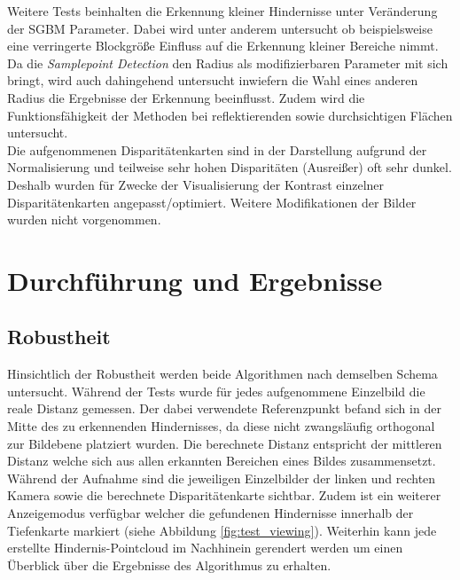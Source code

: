 \noindent
Weitere Tests beinhalten die Erkennung kleiner Hindernisse unter Veränderung der SGBM Parameter. Dabei wird unter anderem untersucht ob beispielsweise eine verringerte Blockgröße Einfluss auf die Erkennung kleiner Bereiche nimmt. Da die \emph{Samplepoint Detection} den Radius als modifizierbaren Parameter mit sich bringt, wird auch dahingehend untersucht inwiefern die Wahl eines anderen Radius die Ergebnisse der Erkennung beeinflusst. Zudem wird die Funktionsfähigkeit der Methoden bei reflektierenden sowie durchsichtigen Flächen untersucht.\\

\noindent
Die aufgenommenen Disparitätenkarten sind in der Darstellung aufgrund der Normalisierung und teilweise sehr hohen Disparitäten (Ausreißer) oft sehr dunkel. Deshalb wurden für Zwecke der Visualisierung der Kontrast einzelner Disparitätenkarten angepasst/optimiert. Weitere Modifikationen der Bilder wurden nicht vorgenommen.


\section{Durchführung und Ergebnisse}

\subsection{Robustheit}
\label{sec:robustness_evaluation}

Hinsichtlich der Robustheit werden beide Algorithmen nach demselben Schema untersucht. Während der Tests wurde für jedes aufgenommene Einzelbild die reale Distanz gemessen. Der dabei verwendete Referenzpunkt befand sich in der Mitte des zu erkennenden Hindernisses, da diese nicht zwangsläufig orthogonal zur Bildebene platziert wurden. Die berechnete Distanz entspricht der mittleren Distanz welche sich aus allen erkannten Bereichen eines Bildes zusammensetzt.\\

\noindent
Während der Aufnahme sind die jeweiligen Einzelbilder der linken und rechten Kamera sowie die berechnete Disparitätenkarte sichtbar. Zudem ist ein weiterer Anzeigemodus verfügbar welcher die gefundenen Hindernisse innerhalb der Tiefenkarte markiert (siehe Abbildung \ref{fig:test_viewing}). Weiterhin kann jede erstellte Hindernis-Pointcloud im Nachhinein gerendert werden um einen Überblick über die Ergebnisse des Algorithmus zu erhalten.

